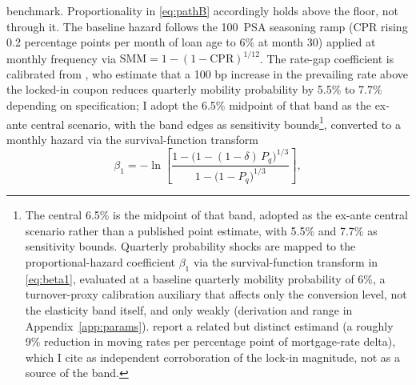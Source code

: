 \documentclass[12pt]{article}
\begin{document}
benchmark. Proportionality in \eqref{eq:pathB} accordingly holds above the floor, not through it. The baseline hazard follows the 100~PSA seasoning ramp (CPR rising 0.2 percentage points per month of loan age to 6\% at month 30) applied at monthly frequency via $\mathrm{SMM} = 1-(1-\mathrm{CPR})^{1/12}$. The rate-gap coefficient is calibrated from \citet{liebersohn2024}, who estimate that a 100 bp increase in the prevailing rate above the locked-in coupon reduces quarterly mobility probability by 5.5\% to 7.7\% depending on specification; I adopt the 6.5\% midpoint of that band as the ex-ante central scenario, with the band edges as sensitivity bounds\footnote{The central 6.5\% is the midpoint of that band, adopted as the ex-ante central scenario rather than a published point estimate, with 5.5\% and 7.7\% as sensitivity bounds. Quarterly probability shocks are mapped to the proportional-hazard coefficient $\beta_1$ via the survival-function transform in \eqref{eq:beta1}, evaluated at a baseline quarterly mobility probability of 6\%, a turnover-proxy calibration auxiliary that affects only the conversion level, not the elasticity band itself, and only weakly (derivation and range in Appendix~\ref{app:params}). \citet{fonseca2024} report a related but distinct estimand (a roughly 9\% reduction in moving rates per percentage point of mortgage-rate delta), which I cite as independent corroboration of the lock-in magnitude, not as a source of the band.}, converted to a monthly hazard via the survival-function transform
\begin{equation}\label{eq:beta1}
\beta_1 = -\ln\!\left[\frac{1-\big(1-(1-\delta)\,P_q\big)^{1/3}}{1-\big(1-P_q\big)^{1/3}}\right],
\end{equation}
\end{document}
